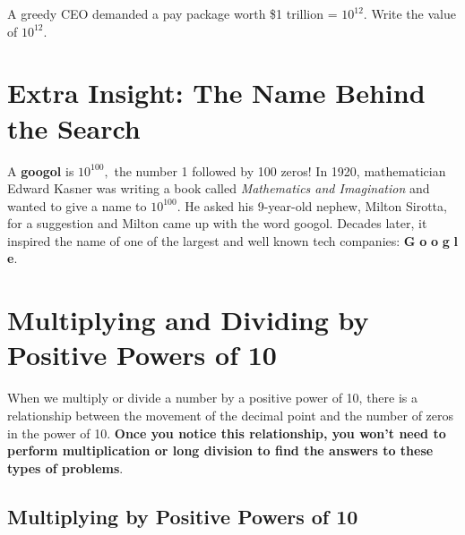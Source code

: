 \documentclass{ximera}
\begin{document}
\begin{problem} A greedy CEO demanded a pay package worth \$1 trillion = $10^{12}.$  Write the value of $10^{12}.$

\begin{multipleChoice}
  \end{multipleChoice}

\end{problem}


\section*{Extra Insight: The Name Behind the Search}

A \textbf{googol} is $10^{100},$ the number 1 followed by 100 zeros!  In 1920, mathematician Edward Kasner was writing a book 
called \emph{Mathematics and Imagination} and wanted to give a name to $10^{100}.$  He asked his 9-year-old nephew, Milton Sirotta, 
for a suggestion and Milton came up with the word googol.  Decades later, it inspired the name of one of the largest 
and well known tech companies: \textcolor{googleblue}{\textbf{G}}%
\textcolor{googlered}{\textbf{o}}%
\textcolor{googleyellow}{\textbf{o}}%
\textcolor{googleblue}{\textbf{g}}%
\textcolor{googlegreen}{\textbf{l}}%
\textcolor{googlered}{\textbf{e}}.


\section*{Multiplying and Dividing by Positive Powers of 10}

When we multiply or divide a number by a positive power of 10, there is a relationship between the movement of the decimal point and the number of zeros
in the power of 10.  \textbf{Once you notice this relationship, you won't need to perform multiplication or long division to find the answers 
to these types of problems}.


\subsection*{Multiplying by Positive Powers of 10}
\end{document}
